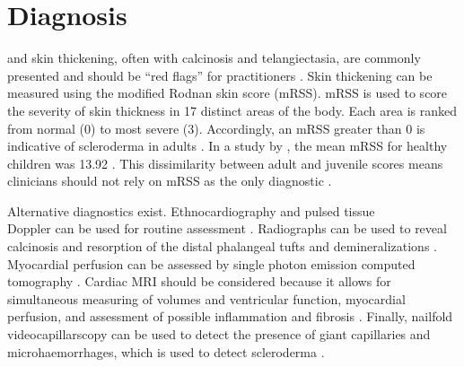 \section{Diagnosis}
\label{diagnosis}

\Rp and skin thickening, often with calcinosis and telangiectasia, are
commonly presented and should be ``red flags'' for practitioners
\citep{redflags,abbasi}. Skin thickening can be measured using the modified
Rodnan skin score (mRSS). mRSS is used to score the severity of skin thickness
in 17 distinct areas of the body. Each area is ranked from normal (0) to most
severe (3). Accordingly, an mRSS greater than 0 is indicative of scleroderma
in adults \citep{eurostar}. In a study by \citeauthor{foeldvari}, the mean
mRSS for healthy children was 13.92 \citep{foeldvari}. This dissimilarity
between adult and juvenile scores means clinicians should not rely on mRSS as
the only diagnostic \citep{hanitsch}.

Alternative diagnostics exist. Ethnocardiography and pulsed tissue \\ Doppler
can be used for routine assessment \citep{allanore}. Radiographs can be used
to reveal calcinosis and resorption of the distal phalangeal tufts and
demineralizations \citep{overviewSSc}. Myocardial perfusion can be assessed by
single photon emission computed tomography \citep{allanore,mele}. Cardiac MRI
should be considered because it allows for simultaneous measuring of volumes
and ventricular function, myocardial perfusion, and assessment of possible
inflammation and fibrosis \citep{allanore}. Finally, nailfold
videocapillarscopy can be used to detect the presence of giant capillaries and
microhaemorrhages, which is used to detect scleroderma \citep{cutulo}.


